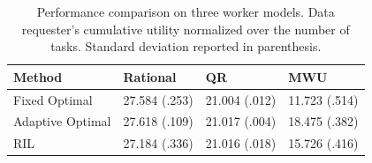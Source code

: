 \begin{table}[t]
\caption{Performance comparison on three worker models. Data requester's cumulative utility normalized over the number of tasks. Standard deviation reported in parenthesis.}
\label{table:performance}
\vskip 0.15in
\centering
{\scriptsize
\begin{sc}
\begin{tabular}{ l | l | l | l }
\hline
Method & Rational & QR & MWU \\ \hline \hline
Fixed Optimal & 27.584 (.253) & 21.004 (.012) & 11.723 (.514) \\
Adaptive Optimal & 27.618 (.109) & 21.017 (.004) & 18.475 (.382) \\
\hline
RIL & 27.184 (.336) & 21.016 (.018) & 15.726 (.416)\\
\hline
\end{tabular}
\end{sc}
}
\vskip -0.1in
\end{table}




